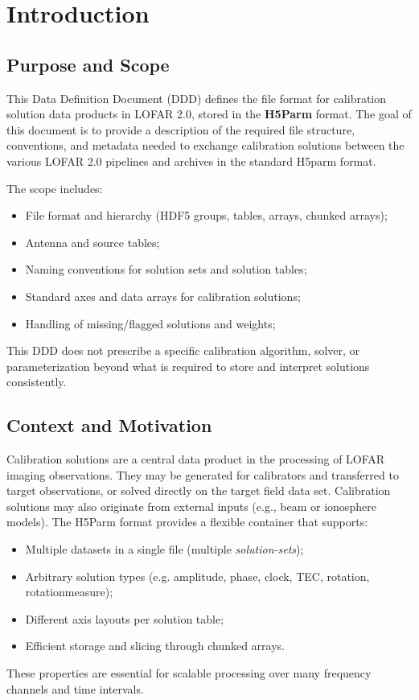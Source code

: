 \documentclass[a4paper,10pt,bibtotoc]{scrartcl}
\begin{document}
\section{Introduction}
\label{sec:introduction}

\subsection{Purpose and Scope}
This Data Definition Document (DDD) defines the file format for {calibration solution} data products in LOFAR 2.0, stored in the \textbf{H5Parm} format. The goal of this document is to provide a  description of the required file structure, conventions, and metadata needed to exchange calibration solutions between the various LOFAR 2.0 pipelines and archives in the standard H5parm format.

The scope includes:
\begin{itemize}
  \item File format and hierarchy (HDF5 groups, tables, arrays, chunked arrays);
  \item Antenna and source tables;
  \item Naming conventions for solution sets and solution tables;
  \item Standard axes and data arrays for calibration solutions;
  \item Handling of missing/flagged solutions and weights;
\end{itemize}

This DDD does not prescribe a specific calibration algorithm, solver, or parameterization beyond
what is required to store and interpret solutions consistently.

\subsection{Context and Motivation}
Calibration solutions are a central data product in the processing of LOFAR imaging observations. They may be
generated for calibrators and transferred to target observations, or solved directly on the target field data set. Calibration solutions may also originate from external inputs (e.g., beam or ionosphere models). The H5Parm format provides a flexible container that supports:
\begin{itemize}
  \item Multiple datasets in a single file (multiple \emph{solution-sets});
  \item Arbitrary solution types (e.g. amplitude, phase, clock, TEC, rotation, rotationmeasure);
  \item Different axis layouts per solution table;
  \item Efficient storage and slicing through chunked arrays.
\end{itemize}
These properties are essential for scalable processing over many frequency channels and time intervals.
\end{document}
